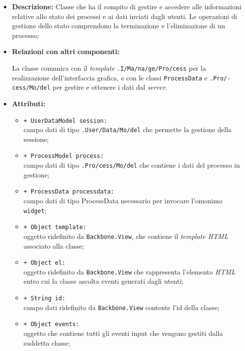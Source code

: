 \begin{flushleft}
\begin{itemize}
\item \textbf{Descrizione:} Classe che ha il compito di gestire e accedere alle informazioni relative allo stato dei processi e ai dati inviati dagli utenti. Le operazioni di gestione dello stato comprendono la terminazione e l'eliminazione di un processo;
\item \textbf{Relazioni con altri componenti:}
\begin{sloppypar}
La classe comunica con il \textit{template} \texttt{\viewAdmin{}.I\fshyp{}Ma\fshyp{}na\fshyp{}ge\fshyp{}Pro\fshyp{}cess} per la realizzazione dell'interfaccia grafica, e con le classi \texttt{ProcessData} e \texttt{\modelAdmin{}.Pro\fshyp{}cess\fshyp{}Mo\fshyp{}del} per gestire e ottenere i dati dal \textit{server}.
\end{sloppypar}
\item \textbf{Attributi:}
\begin{sloppypar}
\begin{itemize}
\item \texttt{+ UserDataModel session:}\\ campo dati di tipo \texttt{\model{}.User\fshyp{}Data\fshyp{}Mo\fshyp{}del} che permette la gestione della sessione;
\item \texttt{+ ProcessModel process:}\\ campo dati di tipo \texttt{\modelAdmin{}.Pro\fshyp{}cess\fshyp{}Mo\fshyp{}del} che contiene i dati del processo in gestione;
\item \texttt{+ ProcessData processdata:}\\ campo dati di tipo ProcessData necessario per invocare l'omonimo \texttt{widget};
\item \texttt{+ Object template:}\\ oggetto ridefinito da \texttt{Backbone.View}, che contiene il \textit{template HTML} associato alla classe;
\item \texttt{+ Object el:}\\ oggetto ridefinito da \texttt{Backbone.View} che rappresenta l'elemento \textit{HTML} entro cui la classe ascolta eventi generati dagli utenti;
\item \texttt{+ String id:}\\ campo dati ridefinito da \texttt{Backbone.View} contente l'id della classe;
\item \texttt{+ Object events:}\\ oggetto che contiene tutti gli eventi input che vengono gestiti dalla suddetta classe;

\end{itemize}
\end{sloppypar}
\end{itemize}
\end{flushleft}
